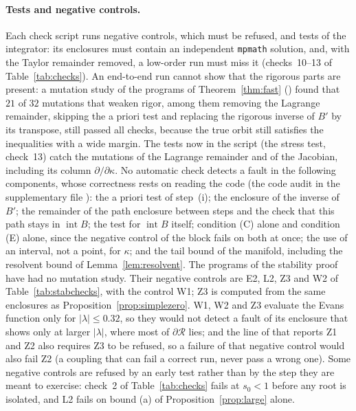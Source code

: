 \documentclass[11pt]{article}
\theoremstyle{definition}
\newcommand{\Rbox}{\mathcal{R}}
\begin{document}
\paragraph{Tests and negative controls.} Each check script runs negative controls, which must be refused, and tests of the integrator: its enclosures must contain an independent \texttt{mpmath} solution, and, with the Taylor remainder removed, a low-order run must miss it (checks~10--13 of Table~\ref{tab:checks}). An end-to-end run cannot show that the rigorous parts are present: a mutation study of the programs of Theorem~\ref{thm:fast} () found that $21$ of $32$ mutations that weaken rigor, among them removing the Lagrange remainder, skipping the a priori test and replacing the rigorous inverse of $B'$ by its transpose, still passed all checks, because the true orbit still satisfies the inequalities with a wide margin. The tests now in the script (the stress test, check~13) catch the mutations of the Lagrange remainder and of the Jacobian, including its column $\partial/\partial\kappa$. No automatic check detects a fault in the following components, whose correctness rests on reading the code (the code audit in the supplementary file ): the a priori test of step~(i); the enclosure of the inverse of $B'$; the remainder of the path enclosure between steps and the check that this path stays in $\operatorname{int} B$; the test for $\operatorname{int} B$ itself; condition (C) alone and condition (E) alone, since the negative control of the block fails on both at once; the use of an interval, not a point, for $\kappa$; and the tail bound of the manifold, including the resolvent bound of Lemma~\ref{lem:resolvent}. The programs of the stability proof have had no mutation study. Their negative controls are E2, L2, Z3 and W2 of Table~\ref{tab:stabchecks}, with the control W1; Z3 is computed from the same enclosures as Proposition~\ref{prop:simplezero}. W1, W2 and Z3 evaluate the Evans function only for $|\lambda| \le 0.32$, so they would not detect a fault of its enclosure that shows only at larger $|\lambda|$, where most of $\partial\Rbox$ lies; and the line of  that reports Z1 and Z2 also requires Z3 to be refused, so a failure of that negative control would also fail Z2 (a coupling that can fail a correct run, never pass a wrong one). Some negative controls are refused by an early test rather than by the step they are meant to exercise: check~2 of Table~\ref{tab:checks} fails at $s_0 < 1$ before any root is isolated, and L2 fails on bound (a) of Proposition~\ref{prop:large} alone.
\end{document}
